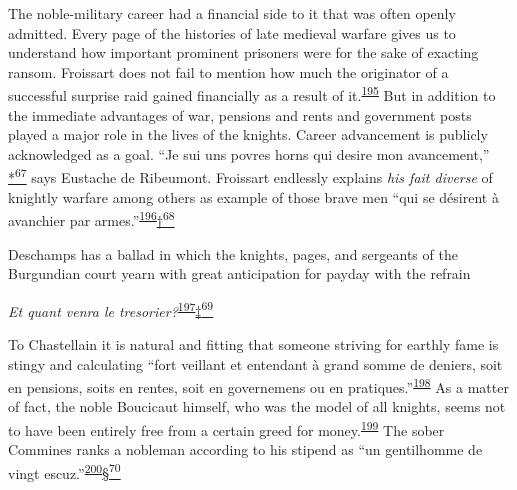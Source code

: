 \protect\hypertarget{10_Chapter_Three__THE_HEROIC_DREAM.xhtmlux5cux23page_117}{}{}The
noble-military career had a financial side to it that was often openly
admitted. Every page of the histories of late medieval warfare gives us
to understand how important prominent prisoners were for the sake of
exacting ransom. Froissart does not fail to mention how much the
originator of a successful surprise raid gained financially as a result
of
it.\textsuperscript{\protect\hypertarget{10_Chapter_Three__THE_HEROIC_DREAM.xhtmlux5cux23id_1547}{\protect\hyperlink{23_NOTES.xhtmlux5cux23id_1548}{195}}}
But in addition to the immediate advantages of war, pensions and rents
and government posts played a major role in the lives of the knights.
Career advancement is publicly acknowledged as a goal. ``Je sui uns
povres horns qui desire mon avancement,''
\protect\hypertarget{10_Chapter_Three__THE_HEROIC_DREAM.xhtmlux5cux23id_2921}{\protect\hyperlink{23_NOTES.xhtmlux5cux23id_2922}{*\textsuperscript{67}}}
says Eustache de Ribeumont. Froissart endlessly explains \emph{his fait
diverse} of knightly warfare among others as example of those brave men
``qui se désirent à avanchier par
armes.''\textsuperscript{\protect\hypertarget{10_Chapter_Three__THE_HEROIC_DREAM.xhtmlux5cux23id_1545}{\protect\hyperlink{23_NOTES.xhtmlux5cux23id_1546}{196}}}\protect\hypertarget{10_Chapter_Three__THE_HEROIC_DREAM.xhtmlux5cux23id_2923}{\protect\hyperlink{23_NOTES.xhtmlux5cux23id_2924}{†\textsuperscript{68}}}

Deschamps has a ballad in which the knights, pages, and sergeants of the
Burgundian court yearn with great anticipation for payday with the
refrain

\emph{Et quant venra le
tresorier?}\textsuperscript{\protect\hypertarget{10_Chapter_Three__THE_HEROIC_DREAM.xhtmlux5cux23id_1543}{\protect\hyperlink{23_NOTES.xhtmlux5cux23id_1544}{197}}}\protect\hypertarget{10_Chapter_Three__THE_HEROIC_DREAM.xhtmlux5cux23id_2925}{\protect\hyperlink{23_NOTES.xhtmlux5cux23id_2926}{‡\textsuperscript{69}}}

To Chastellain it is natural and fitting that someone striving for
earthly fame is stingy and calculating ``fort veillant et entendant à
grand somme de deniers, soit en pensions, soits en rentes, soit en
governemens ou en
pratiques.''\textsuperscript{\protect\hypertarget{10_Chapter_Three__THE_HEROIC_DREAM.xhtmlux5cux23id_1541}{\protect\hyperlink{23_NOTES.xhtmlux5cux23id_1542}{198}}}
As a matter of fact, the noble Boucicaut himself, who was the model of
all knights, seems not to have been entirely free from a certain greed
for
money.\textsuperscript{\protect\hypertarget{10_Chapter_Three__THE_HEROIC_DREAM.xhtmlux5cux23id_1539}{\protect\hyperlink{23_NOTES.xhtmlux5cux23id_1540}{199}}}
The sober Commines ranks a nobleman according to his stipend as ``un
gentilhomme de vingt
escuz.''\textsuperscript{\protect\hypertarget{10_Chapter_Three__THE_HEROIC_DREAM.xhtmlux5cux23id_1537}{\protect\hyperlink{23_NOTES.xhtmlux5cux23id_1538}{200}}}\protect\hypertarget{10_Chapter_Three__THE_HEROIC_DREAM.xhtmlux5cux23id_2927}{\protect\hyperlink{23_NOTES.xhtmlux5cux23id_2928}{§\textsuperscript{70}}}

